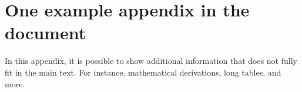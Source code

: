 \chapter[\MakeUppercase{One Appendix}]{One example appendix in the document}\label{app:appendix_01}
\pagestyle{MyThesisStyle}

In this appendix, it is possible to show additional information that does not fully fit in the main text. For instance, mathematical derivations, long tables, and more.


